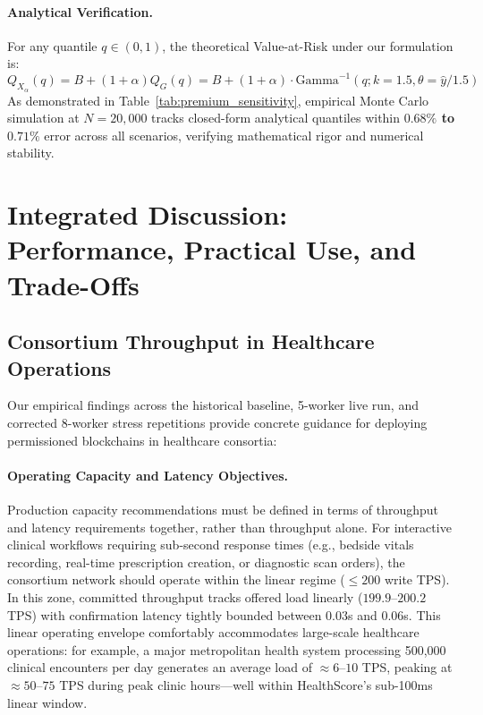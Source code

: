 \documentclass[runningheads]{llncs}
\begin{document}
\paragraph{Analytical Verification.}
For any quantile $q \in (0, 1)$, the theoretical Value-at-Risk under our formulation is:
\begin{equation}
Q_{X_\alpha}(q) = B + (1 + \alpha) Q_G(q) = B + (1 + \alpha) \cdot \text{Gamma}^{-1}(q; k=1.5, \theta=\hat{y}/1.5)
\end{equation}
As demonstrated in Table~\ref{tab:premium_sensitivity}, empirical Monte Carlo simulation at $N = 20,000$ tracks closed-form analytical quantiles within \textbf{$0.68\%$ to $0.71\%$} error across all scenarios, verifying mathematical rigor and numerical stability.

\section{Integrated Discussion: Performance, Practical Use, and Trade-Offs}

\subsection{Consortium Throughput in Healthcare Operations}
Our empirical findings across the historical baseline, 5-worker live run, and corrected 8-worker stress repetitions provide concrete guidance for deploying permissioned blockchains in healthcare consortia:

\paragraph{Operating Capacity and Latency Objectives.}
Production capacity recommendations must be defined in terms of throughput and latency requirements together, rather than throughput alone. For interactive clinical workflows requiring sub-second response times (e.g., bedside vitals recording, real-time prescription creation, or diagnostic scan orders), the consortium network should operate within the linear regime ($\le 200$ write TPS). In this zone, committed throughput tracks offered load linearly ($199.9$--$200.2$ TPS) with confirmation latency tightly bounded between $0.03$s and $0.06$s. This linear operating envelope comfortably accommodates large-scale healthcare operations: for example, a major metropolitan health system processing 500,000 clinical encounters per day generates an average load of $\approx 6$--$10$ TPS, peaking at $\approx 50$--$75$ TPS during peak clinic hours---well within HealthScore's sub-100ms linear window.
\end{document}
